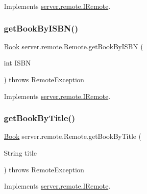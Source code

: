 Implements \hyperlink{interfaceserver_1_1remote_1_1_i_remote_a3ff8752a1911b6ca54fc4a04af90fe7a}{server.\+remote.\+I\+Remote}.

\mbox{\label{classserver_1_1remote_1_1_remote_a36ffc6f95ea75ad7d393ea296e1bc0cc}} 
\subsubsection{\texorpdfstring{get\+Book\+By\+I\+S\+B\+N()}{getBookByISBN()}}
{\footnotesize\ttfamily \hyperlink{classserver_1_1data_1_1_book}{Book} server.\+remote.\+Remote.\+get\+Book\+By\+I\+S\+BN (\begin{DoxyParamCaption}\item[{int}]{I\+S\+BN }\end{DoxyParamCaption}) throws Remote\+Exception}



Implements \hyperlink{interfaceserver_1_1remote_1_1_i_remote_a736183bf7a57f78acf11fb78ae0f0e58}{server.\+remote.\+I\+Remote}.

\mbox{\label{classserver_1_1remote_1_1_remote_a560427fc017e15f04e12bd880e6f086e}} 
\subsubsection{\texorpdfstring{get\+Book\+By\+Title()}{getBookByTitle()}}
{\footnotesize\ttfamily \hyperlink{classserver_1_1data_1_1_book}{Book} server.\+remote.\+Remote.\+get\+Book\+By\+Title (\begin{DoxyParamCaption}\item[{String}]{title }\end{DoxyParamCaption}) throws Remote\+Exception}



Implements \hyperlink{interfaceserver_1_1remote_1_1_i_remote_a520cc1af90d13264c14b32e19b5ce712}{server.\+remote.\+I\+Remote}.


